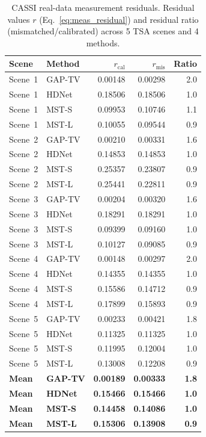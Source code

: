 \documentclass[11pt]{article}
\theoremstyle{definition}
\begin{document}
\begin{table}[htbp]
\centering
\caption{CASSI real-data measurement residuals.
Residual values $r$ (Eq.~\ref{eq:meas_residual}) and residual ratio
(mismatched/calibrated) across 5 TSA scenes and 4 methods.}
\label{tab:cassi_real}
\begin{tabular}{l l r r r}
\toprule
\textbf{Scene} & \textbf{Method} &
  \textbf{$r_{\mathrm{cal}}$} & \textbf{$r_{\mathrm{mis}}$} &
  \textbf{Ratio} \\
\midrule
Scene~1 & GAP-TV  & 0.00148 & 0.00298 & 2.0 \\
Scene~1 & HDNet   & 0.18506 & 0.18506 & 1.0 \\
Scene~1 & MST-S   & 0.09953 & 0.10746 & 1.1 \\
Scene~1 & MST-L   & 0.10055 & 0.09544 & 0.9 \\
\midrule
Scene~2 & GAP-TV  & 0.00210 & 0.00331 & 1.6 \\
Scene~2 & HDNet   & 0.14853 & 0.14853 & 1.0 \\
Scene~2 & MST-S   & 0.25357 & 0.23807 & 0.9 \\
Scene~2 & MST-L   & 0.25441 & 0.22811 & 0.9 \\
\midrule
Scene~3 & GAP-TV  & 0.00204 & 0.00320 & 1.6 \\
Scene~3 & HDNet   & 0.18291 & 0.18291 & 1.0 \\
Scene~3 & MST-S   & 0.09399 & 0.09160 & 1.0 \\
Scene~3 & MST-L   & 0.10127 & 0.09085 & 0.9 \\
\midrule
Scene~4 & GAP-TV  & 0.00148 & 0.00297 & 2.0 \\
Scene~4 & HDNet   & 0.14355 & 0.14355 & 1.0 \\
Scene~4 & MST-S   & 0.15586 & 0.14712 & 0.9 \\
Scene~4 & MST-L   & 0.17899 & 0.15893 & 0.9 \\
\midrule
Scene~5 & GAP-TV  & 0.00233 & 0.00421 & 1.8 \\
Scene~5 & HDNet   & 0.11325 & 0.11325 & 1.0 \\
Scene~5 & MST-S   & 0.11995 & 0.12004 & 1.0 \\
Scene~5 & MST-L   & 0.13008 & 0.12208 & 0.9 \\
\midrule
\textbf{Mean} & \textbf{GAP-TV} & \textbf{0.00189} & \textbf{0.00333} & \textbf{1.8} \\
\textbf{Mean} & \textbf{HDNet}  & \textbf{0.15466} & \textbf{0.15466} & \textbf{1.0} \\
\textbf{Mean} & \textbf{MST-S}  & \textbf{0.14458} & \textbf{0.14086} & \textbf{1.0} \\
\textbf{Mean} & \textbf{MST-L}  & \textbf{0.15306} & \textbf{0.13908} & \textbf{0.9} \\
\bottomrule
\end{tabular}
\end{table}
\end{document}
